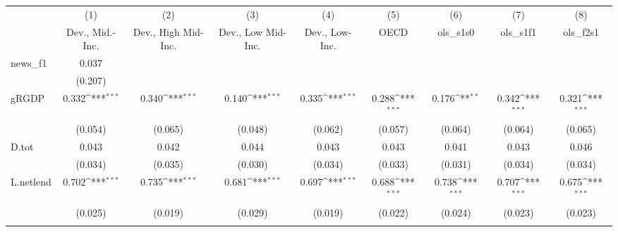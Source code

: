 {
\def\sym#1{\ifmmode^{#1}\else\(^{#1}\)\fi}
\begin{tabular}{l*{8}{c}}
\toprule
            &\multicolumn{1}{c}{(1)}&\multicolumn{1}{c}{(2)}&\multicolumn{1}{c}{(3)}&\multicolumn{1}{c}{(4)}&\multicolumn{1}{c}{(5)}&\multicolumn{1}{c}{(6)}&\multicolumn{1}{c}{(7)}&\multicolumn{1}{c}{(8)}\\
            &\multicolumn{1}{c}{Dev., Mid.-Inc.}&\multicolumn{1}{c}{Dev., High Mid-Inc.}&\multicolumn{1}{c}{Dev., Low Mid-Inc.}&\multicolumn{1}{c}{Dev., Low-Inc.}&\multicolumn{1}{c}{OECD}&\multicolumn{1}{c}{ols\_s1s0}&\multicolumn{1}{c}{ols\_s1f1}&\multicolumn{1}{c}{ols\_f2s1}\\
\midrule
news\_f1     &       0.037         &                     &                     &                     &                     &                     &                     &                     \\
            &     (0.207)         &                     &                     &                     &                     &                     &                     &                     \\
\addlinespace
gRGDP       &       0.332\sym{***}&       0.340\sym{***}&       0.140\sym{***}&       0.335\sym{***}&       0.288\sym{***}&       0.176\sym{**} &       0.342\sym{***}&       0.321\sym{***}\\
            &     (0.054)         &     (0.065)         &     (0.048)         &     (0.062)         &     (0.057)         &     (0.064)         &     (0.064)         &     (0.065)         \\
\addlinespace
D.tot       &       0.043         &       0.042         &       0.044         &       0.043         &       0.043         &       0.041         &       0.043         &       0.046         \\
            &     (0.034)         &     (0.035)         &     (0.030)         &     (0.034)         &     (0.033)         &     (0.031)         &     (0.034)         &     (0.034)         \\
\addlinespace
L.netlend   &       0.702\sym{***}&       0.735\sym{***}&       0.681\sym{***}&       0.697\sym{***}&       0.688\sym{***}&       0.738\sym{***}&       0.707\sym{***}&       0.675\sym{***}\\
            &     (0.025)         &     (0.019)         &     (0.029)         &     (0.019)         &     (0.022)         &     (0.024)         &     (0.023)         &     (0.023)         \\
\addlinespace

\end{tabular}}
